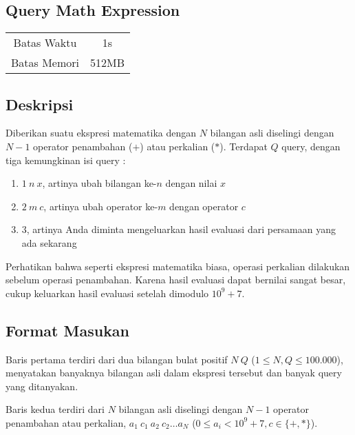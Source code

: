 \documentclass{article}
\begin{document}
\begin{center}
    \section*{Query Math Expression} %

    \begin{tabular}{ | c c | }
        \hline
        Batas Waktu  & 1s \\    %
        Batas Memori & 512MB \\  %
        \hline
    \end{tabular}
\end{center}

\subsection*{Deskripsi}

Diberikan suatu ekspresi matematika dengan $N$ bilangan asli diselingi dengan $N-1$ operator penambahan ($+$) atau perkalian ($*$). Terdapat $Q$ query, dengan tiga kemungkinan isi query :

\begin{enumerate}
    \setlength\itemsep{0pt}
    \item $1\:n\:x$, artinya ubah bilangan ke-$n$ dengan nilai $x$
    \item $2\:m\:c$, artinya ubah operator ke-$m$ dengan operator $c$
    \item $3$, artinya Anda diminta mengeluarkan hasil evaluasi dari persamaan yang ada sekarang
\end{enumerate}

Perhatikan bahwa seperti ekspresi matematika biasa, operasi perkalian dilakukan sebelum operasi penambahan. Karena hasil evaluasi dapat bernilai sangat besar, cukup keluarkan hasil evaluasi setelah dimodulo $10^9+7$.

\subsection*{Format Masukan}

Baris pertama terdiri dari dua bilangan bulat positif $N\:Q$ ($1 \leq N, Q \leq 100.000$), menyatakan banyaknya bilangan asli dalam ekspresi tersebut dan banyak query yang ditanyakan. 

Baris kedua terdiri dari $N$ bilangan asli diselingi dengan $N-1$ operator penambahan atau perkalian, $a_1\:c_1\:a_2\:c_2\ldots a_N$ ($0 \leq a_i < 10^9+7, c \in \{+,*\}$).
\end{document}
